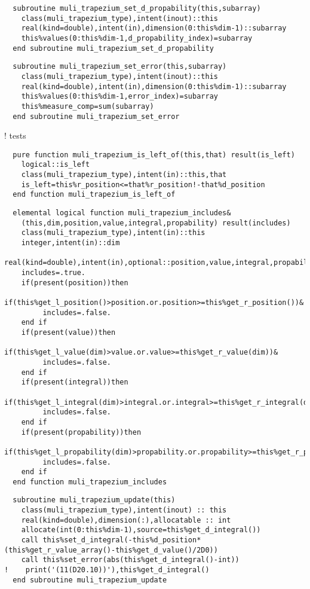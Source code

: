 \begin{Verbatim}
  subroutine muli_trapezium_set_d_propability(this,subarray)
    class(muli_trapezium_type),intent(inout)::this
    real(kind=double),intent(in),dimension(0:this%dim-1)::subarray
    this%values(0:this%dim-1,d_propability_index)=subarray
  end subroutine muli_trapezium_set_d_propability
\end{Verbatim}

\begin{Verbatim}
  subroutine muli_trapezium_set_error(this,subarray)
    class(muli_trapezium_type),intent(inout)::this
    real(kind=double),intent(in),dimension(0:this%dim-1)::subarray
    this%values(0:this%dim-1,error_index)=subarray
    this%measure_comp=sum(subarray)
  end subroutine muli_trapezium_set_error
\end{Verbatim}

  ! tests

\begin{Verbatim}
  pure function muli_trapezium_is_left_of(this,that) result(is_left)
    logical::is_left
    class(muli_trapezium_type),intent(in)::this,that
    is_left=this%r_position<=that%r_position!-that%d_position
  end function muli_trapezium_is_left_of
\end{Verbatim}

\begin{Verbatim}
  elemental logical function muli_trapezium_includes&
    (this,dim,position,value,integral,propability) result(includes)
    class(muli_trapezium_type),intent(in)::this
    integer,intent(in)::dim
    real(kind=double),intent(in),optional::position,value,integral,propability
    includes=.true.
    if(present(position))then
       if(this%get_l_position()>position.or.position>=this%get_r_position())&
         includes=.false.
    end if
    if(present(value))then
       if(this%get_l_value(dim)>value.or.value>=this%get_r_value(dim))&
         includes=.false.
    end if
    if(present(integral))then
       if(this%get_l_integral(dim)>integral.or.integral>=this%get_r_integral(dim))&
         includes=.false.
    end if
    if(present(propability))then
       if(this%get_l_propability(dim)>propability.or.propability>=this%get_r_propability(dim))&
         includes=.false.
    end if    
  end function muli_trapezium_includes
\end{Verbatim}

\begin{Verbatim}
  subroutine muli_trapezium_update(this)
    class(muli_trapezium_type),intent(inout) :: this
    real(kind=double),dimension(:),allocatable :: int
    allocate(int(0:this%dim-1),source=this%get_d_integral())
    call this%set_d_integral(-this%d_position*(this%get_r_value_array()-this%get_d_value()/2D0))
    call this%set_error(abs(this%get_d_integral()-int))
!    print('(11(D20.10))'),this%get_d_integral()
  end subroutine muli_trapezium_update
\end{Verbatim}

